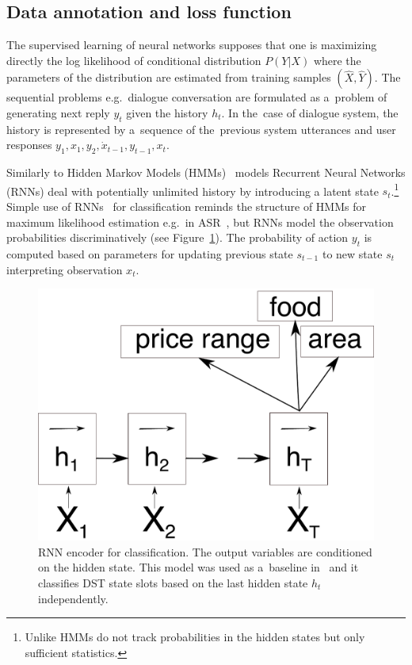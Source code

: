 \documentclass[11pt]{article}
\begin{document}
\subsection{Data annotation and loss function}
\label{sub:data_annotation}

The supervised learning of neural networks supposes that one is maximizing directly the log likelihood of conditional distribution $ P(Y| X) $ where the parameters of the distribution are estimated from training samples $ (\hat{X}, \hat{Y}) $.
The sequential problems e.g.\ dialogue conversation are formulated as a~problem of generating next reply $y_t$ given the history $h_t$.
In the~case of dialogue system, the history is represented by a~sequence of the~previous system utterances and user responses $ y_1, x_1, y_2, \dot x_{t-1}, y_{t-1}, x_t $.

Similarly to Hidden Markov Models (HMMs)~\cite{huang_hidden_1990} models Recurrent Neural Networks (RNNs) deal with potentially unlimited history by introducing a latent state $s_t$.\footnote{Unlike HMMs do not track probabilities in the hidden states but only sufficient statistics.}
Simple use of  RNNs~\cite{gers_learning_2000} for classification reminds the structure of HMMs for maximum likelihood estimation e.g.\ in ASR~\cite{huang_hidden_1990}, but RNNs model the observation probabilities discriminatively (see Figure~\ref{fig:encoder}).
The probability of action $ y_t $ is computed based on parameters for updating previous state $s_{t-1}$ to new state $s_t$ interpreting observation $x_t$.

\begin{figure}[htpb]
    \centering
    \includegraphics[width=0.8\linewidth]{encoder}
    \caption{RNN encoder for classification. The output variables are conditioned on the hidden state. 
    This model was used as a~baseline in~\cite{platek_recurrent_2016} and it classifies DST state slots based on the last hidden state $h_t$ independently.}
\label{fig:encoder}
\end{figure}
\end{document}

